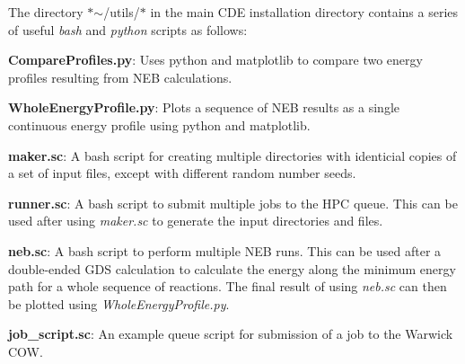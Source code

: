 The directory $\ast$$\sim$/utils/$\ast$ in the main C\+DE installation directory contains a series of useful {\itshape bash} and {\itshape python} scripts as follows\+:


\begin{DoxyItemize}
\item {\bfseries{Compare\+Profiles.\+py}}\+: Uses python and matplotlib to compare two energy profiles resulting from N\+EB calculations.
\item {\bfseries{Whole\+Energy\+Profile.\+py}}\+: Plots a sequence of N\+EB results as a single continuous energy profile using python and matplotlib.
\item {\bfseries{maker.\+sc}}\+: A bash script for creating multiple directories with identicial copies of a set of input files, except with different random number seeds.
\item {\bfseries{runner.\+sc}}\+: A bash script to submit multiple jobs to the H\+PC queue. This can be used after using {\itshape maker.\+sc} to generate the input directories and files.
\item {\bfseries{neb.\+sc}}\+: A bash script to perform multiple N\+EB runs. This can be used after a double-\/ended G\+DS calculation to calculate the energy along the minimum energy path for a whole sequence of reactions. The final result of using {\itshape neb.\+sc} can then be plotted using {\itshape Whole\+Energy\+Profile.\+py}.
\item {\bfseries{job\+\_\+script.\+sc}}\+: An example queue script for submission of a job to the Warwick C\+OW. 
\end{DoxyItemize}
